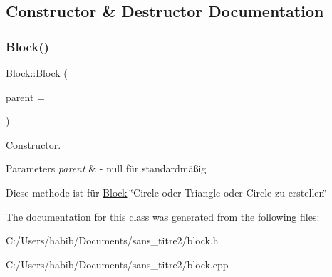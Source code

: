 \subsection{Constructor \& Destructor Documentation}
\mbox{\label{class_block_a2577ea15ea83c909f9519842fa160fd0}} 
\subsubsection{\texorpdfstring{Block()}{Block()}}
{\footnotesize\ttfamily Block\+::\+Block (\begin{DoxyParamCaption}\item[{Q\+Graphics\+Item $\ast$}]{parent = {} }\end{DoxyParamCaption})}



Constructor. 


\begin{DoxyParams}{Parameters}
{\em parent} & -\/ null für standardmäßig\\
\hline
\end{DoxyParams}
Diese methode ist für \hyperlink{class_block}{Block} \char`\"{}\+Circle oder  Triangle oder Circle zu erstellen\char`\"{} 

The documentation for this class was generated from the following files\+:\begin{DoxyCompactItemize}
\item 
C\+:/\+Users/habib/\+Documents/sans\+\_\+titre2/block.\+h\item 
C\+:/\+Users/habib/\+Documents/sans\+\_\+titre2/block.\+cpp\end{DoxyCompactItemize}
